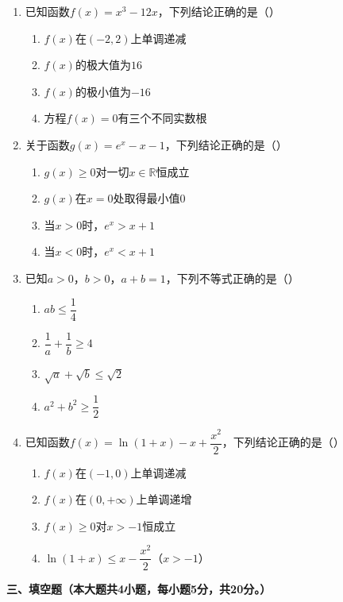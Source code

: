 \documentclass[12pt, a4paper]{ctexart}
\begin{document}
\begin{enumerate}[label=\arabic*.]

\item 已知函数$f(x)=x^3-12x$，下列结论正确的是（\quad）
\begin{enumerate}[label=]
\item $f(x)$在$(-2,2)$上单调递减
\item $f(x)$的极大值为$16$
\item $f(x)$的极小值为$-16$
\item 方程$f(x)=0$有三个不同实数根
\end{enumerate}

\item 关于函数$g(x)=e^x-x-1$，下列结论正确的是（\quad）
\begin{enumerate}[label=]
\item $g(x)\geq 0$对一切$x\in\mathbb{R}$恒成立
\item $g(x)$在$x=0$处取得最小值$0$
\item 当$x>0$时，$e^x>x+1$
\item 当$x<0$时，$e^x<x+1$
\end{enumerate}

\item 已知$a>0$，$b>0$，$a+b=1$，下列不等式正确的是（\quad）
\begin{enumerate}[label=]
\item $ab\leq\dfrac{1}{4}$
\item $\dfrac{1}{a}+\dfrac{1}{b}\geq 4$
\item $\sqrt{a}+\sqrt{b}\leq\sqrt{2}$
\item $a^2+b^2\geq\dfrac{1}{2}$
\end{enumerate}

\item 已知函数$f(x)=\ln(1+x)-x+\dfrac{x^2}{2}$，下列结论正确的是（\quad）
\begin{enumerate}[label=]
\item $f(x)$在$(-1,0)$上单调递减
\item $f(x)$在$(0,+\infty)$上单调递增
\item $f(x)\geq 0$对$x>-1$恒成立
\item $\ln(1+x)\leq x-\dfrac{x^2}{2}$（$x>-1$）
\end{enumerate}

\end{enumerate}

\vspace{0.5em}

\noindent\textbf{三、填空题（本大题共4小题，每小题5分，共20分。）}
\end{document}
